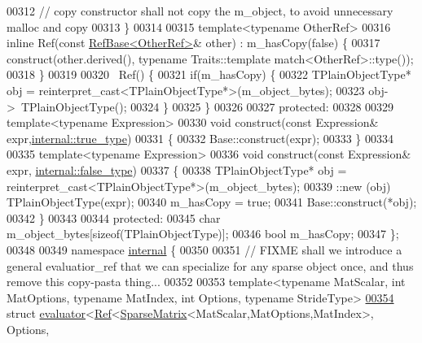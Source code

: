 \begin{DoxyCode}
00312       \textcolor{comment}{// copy constructor shall not copy the m\_object, to avoid unnecessary malloc and copy}
00313     \}
00314 
00315     \textcolor{keyword}{template}<\textcolor{keyword}{typename} OtherRef>
00316     \textcolor{keyword}{inline} Ref(\textcolor{keyword}{const} \hyperlink{class_eigen_1_1_ref_base}{RefBase<OtherRef>}& other) : m\_hasCopy(\textcolor{keyword}{false}) \{
00317       construct(other.derived(), \textcolor{keyword}{typename} Traits::template match<OtherRef>::type());
00318     \}
00319 
00320     ~Ref() \{
00321       \textcolor{keywordflow}{if}(m\_hasCopy) \{
00322         TPlainObjectType* obj = \textcolor{keyword}{reinterpret\_cast<}TPlainObjectType*\textcolor{keyword}{>}(m\_object\_bytes);
00323         obj->~TPlainObjectType();
00324       \}
00325     \}
00326 
00327   \textcolor{keyword}{protected}:
00328 
00329     \textcolor{keyword}{template}<\textcolor{keyword}{typename} Expression>
00330     \textcolor{keywordtype}{void} construct(\textcolor{keyword}{const} Expression& expr,\hyperlink{struct_eigen_1_1internal_1_1true__type}{internal::true\_type})
00331     \{
00332       Base::construct(expr);
00333     \}
00334 
00335     \textcolor{keyword}{template}<\textcolor{keyword}{typename} Expression>
00336     \textcolor{keywordtype}{void} construct(\textcolor{keyword}{const} Expression& expr, \hyperlink{struct_eigen_1_1internal_1_1false__type}{internal::false\_type})
00337     \{
00338       TPlainObjectType* obj = \textcolor{keyword}{reinterpret\_cast<}TPlainObjectType*\textcolor{keyword}{>}(m\_object\_bytes);
00339       ::new (obj) TPlainObjectType(expr);
00340       m\_hasCopy = \textcolor{keyword}{true};
00341       Base::construct(*obj);
00342     \}
00343 
00344   \textcolor{keyword}{protected}:
00345     \textcolor{keywordtype}{char} m\_object\_bytes[\textcolor{keyword}{sizeof}(TPlainObjectType)];
00346     \textcolor{keywordtype}{bool} m\_hasCopy;
00347 \};
00348 
00349 \textcolor{keyword}{namespace }\hyperlink{namespaceinternal}{internal} \{
00350 
00351 \textcolor{comment}{// FIXME shall we introduce a general evaluatior\_ref that we can specialize for any sparse object once, and
       thus remove this copy-pasta thing...}
00352 
00353 \textcolor{keyword}{template}<\textcolor{keyword}{typename} MatScalar, \textcolor{keywordtype}{int} MatOptions, \textcolor{keyword}{typename} MatIndex, \textcolor{keywordtype}{int} Options, \textcolor{keyword}{typename} Str\textcolor{keywordtype}{id}eType>
\hyperlink{struct_eigen_1_1internal_1_1evaluator_3_01_ref_3_01_sparse_matrix_3_01_mat_scalar_00_01_mat_opti1f146c69a21d0c41f4f1c116a0c5fce2}{00354} \textcolor{keyword}{struct }\hyperlink{struct_eigen_1_1internal_1_1evaluator}{evaluator}<\hyperlink{group___core___module_class_eigen_1_1_ref}{Ref}<\hyperlink{group___sparse_core___module_class_eigen_1_1_sparse_matrix}{SparseMatrix}<MatScalar,MatOptions,MatIndex>, Options, 

\end{DoxyCode}

